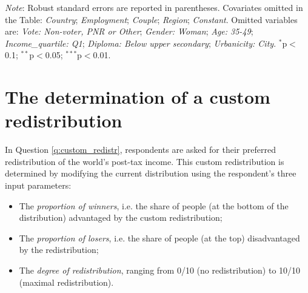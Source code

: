 \begin{table}[h]\label{tab:determinant}
    \caption[Correlates of support for global redistribution]{Correlates of support for global redistribution (multivariate OLS regressions). %
    } 
    \makebox[\textwidth][c]{
\resizebox*{!}{.73\textheight}{ %
        
        }
    }
    {\footnotesize \textit{Note}: Robust standard errors are reported in parentheses. Covariates omitted in the Table: \textit{Country}; \textit{Employment}; \textit{Couple}; \textit{Region}; \textit{Constant}. Omitted variables are: \textit{Vote: Non-voter, PNR or Other}; \textit{Gender: Woman}; \textit{Age: 35-49}; \textit{Income\_quartile: Q1}; \textit{Diploma: Below upper secondary}; \textit{Urbanicity: City}. \hfill $^{*}$p$<$0.1; $^{**}$p$<$0.05; $^{***}$p$<$0.01.
    }
\end{table}

\clearpage
\section{The determination of a custom redistribution}\label{app:algo}

In Question \ref{q:custom_redistr}, respondents are asked for their preferred redistribution of the world's post-tax income. This custom redistribution is determined by modifying the current distribution using the respondent's three input parameters:
\begin{itemize}
    \item The \textit{proportion of winners}, i.e. the share of people (at the bottom of the distribution) advantaged by the custom redistribution;
    \item The \textit{proportion of losers}, i.e. the share of people (at the top) disadvantaged by the redistribution;
    \item The \textit{degree of redistribution}, ranging from 0/10 (no redistribution) to 10/10 (maximal redistribution).
\end{itemize}


